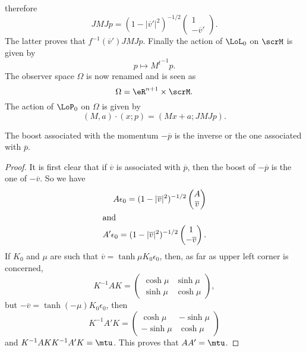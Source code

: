 therefore
\begin{equation}
 JMJp=(1-|\overline{v}'|^2)^{-1/2}
\begin{pmatrix}
1\\-\overline{v}'
\end{pmatrix}.
\end{equation}
The latter proves that $f^{-1}(\overline{v}')JMJp$. Finally the action of $\LoL_0$ on $\scrM$ is given by 
\[ 
  p\mapsto {M^{t}}^{-1} p.
\]
The observer space $\Omega$ is now renamed  and is seen as 
\begin{equation}
\Omega=\eR^{n+1}\times\scrM.
\end{equation}
The action of $\LoP_0$ on $\Omega$ is given by
\begin{equation} \label{eq_Maxp}
(M,a)\cdot(x;p)=(Mx+a;JMJp).
\end{equation}


\begin{lemma} \label{lem_boost_inverse}
The boost associated with the momentum $-\overline{p}$ is the inverse or the one associated with $\overline{p}$.
\end{lemma}


\begin{proof}
It is first clear that if $\overline{v}$ is associated with $\overline{p}$, then the boost of $-\overline{p}$ is the one of $-\overline{v}$. So we have
\begin{subequations}
\begin{align}
  A\epsilon_0=(1-|\overline{v}|^2)^{-1/2}
\begin{pmatrix}
A\\\overline{v}
\end{pmatrix}\\
\intertext{and}
A'\epsilon_0=(1-|\overline{v}|^2)^{-1/2}
\begin{pmatrix}
1\\-\overline{v}
\end{pmatrix}.
\end{align}
\end{subequations}
If $K_0$ and $\mu$ are such that $\overline{v}=\tanh\mu K_0\epsilon_0$, then, as far as upper left corner is concerned,
\[ 
  K^{-1}AK=
\begin{pmatrix}
\cosh\mu & \sinh\mu\\
\sinh\mu & \cosh\mu
\end{pmatrix},
\]
but $-\overline{v}=\tanh(-\mu)K_0\epsilon_0$, then
\[ 
  K^{-1}A'K=
\begin{pmatrix}
\cosh\mu & -\sinh \mu\\
-\sinh\mu & \cosh\mu
\end{pmatrix}
\]
and $K^{-1}AKK^{-1}A'K=\mtu$. This proves that $AA'=\mtu$.
\end{proof}


